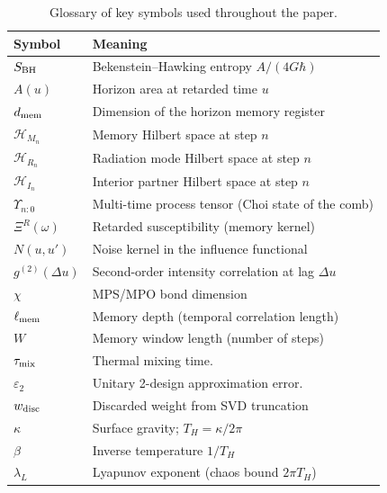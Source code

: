 \documentclass[aps,prd,preprint,onecolumn,superscriptaddress,nofootinbib,longbibliography,floatfix,11pt,showpacs,showkeys]{revtex4-2}
\theoremstyle{plain}
\theoremstyle{definition}
\theoremstyle{remark}
\begin{document}
\begin{table}[htbp]
\centering
\caption{Glossary of key symbols used throughout the paper.}
\label{tab:glossary}
\begin{tabular}{ll}
\toprule
Symbol & Meaning \\
\midrule
$S_{\rm BH}$ & Bekenstein--Hawking entropy $A/(4G\hbar)$ \\
$A(u)$ & Horizon area at retarded time $u$ \\
$d_{\rm mem}$ & Dimension of the horizon memory register \\
$\mathcal{H}_{M_n}$ & Memory Hilbert space at step $n$ \\
$\mathcal{H}_{R_n}$ & Radiation mode Hilbert space at step $n$ \\
$\mathcal{H}_{I_n}$ & Interior partner Hilbert space at step $n$ \\
$\Upsilon_{n{:}0}$ & Multi-time process tensor (Choi state of the comb) \\
$\Xi^R(\omega)$ & Retarded susceptibility (memory kernel) \\
$N(u,u')$ & Noise kernel in the influence functional \\
$g^{(2)}(\Delta u)$ & Second-order intensity correlation at lag $\Delta u$ \\
$\chi$ & MPS/MPO bond dimension \\
$\ell_{\rm mem}$ & Memory depth (temporal correlation length) \\
$W$ & Memory window length (number of steps) \\
$\tau_{\rm mix}$ & Thermal mixing time. \\
$\varepsilon_2$ & Unitary 2-design approximation error. \\
$w_{\rm disc}$ & Discarded weight from SVD truncation \\
$\kappa$ & Surface gravity; $T_H=\kappa/2\pi$ \\
$\beta$ & Inverse temperature $1/T_H$ \\
$\lambda_L$ & Lyapunov exponent (chaos bound $2\pi T_H$) \\
\bottomrule
\end{tabular}
\end{table}
\end{document}
